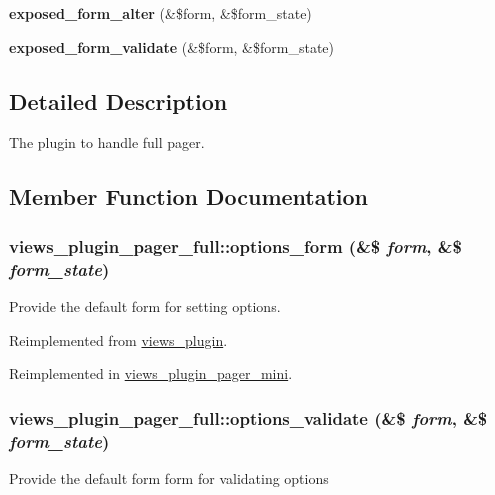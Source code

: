 \begin{DoxyCompactItemize}
\item 
\hypertarget{classviews__plugin__pager__full_a6bf6e6803ad1a864162cf1664592442f}{
{\bfseries exposed\_\-form\_\-alter} (\&\$form, \&\$form\_\-state)}
\label{classviews__plugin__pager__full_a6bf6e6803ad1a864162cf1664592442f}

\item 
\hypertarget{classviews__plugin__pager__full_a8dc9e90defd447d7ca20d63468363f3f}{
{\bfseries exposed\_\-form\_\-validate} (\&\$form, \&\$form\_\-state)}
\label{classviews__plugin__pager__full_a8dc9e90defd447d7ca20d63468363f3f}

\end{DoxyCompactItemize}


\subsection{Detailed Description}
The plugin to handle full pager. 

\subsection{Member Function Documentation}
\hypertarget{classviews__plugin__pager__full_a4f3bcc9bc5ab8ddbbcacdce3108dcfd7}{
\subsubsection[{options\_\-form}]{\setlength{\rightskip}{0pt plus 5cm}views\_\-plugin\_\-pager\_\-full::options\_\-form (\&\$ {\em form}, \/  \&\$ {\em form\_\-state})}}
\label{classviews__plugin__pager__full_a4f3bcc9bc5ab8ddbbcacdce3108dcfd7}
Provide the default form for setting options. 

Reimplemented from \hyperlink{classviews__plugin_a1aaed8da1afd9f45293a37358c159837}{views\_\-plugin}.

Reimplemented in \hyperlink{classviews__plugin__pager__mini_adfab7244c29b6398132916429741bc1f}{views\_\-plugin\_\-pager\_\-mini}.\hypertarget{classviews__plugin__pager__full_a00fca2bdd3dfda2bea07b01a6f8384a4}{
\subsubsection[{options\_\-validate}]{\setlength{\rightskip}{0pt plus 5cm}views\_\-plugin\_\-pager\_\-full::options\_\-validate (\&\$ {\em form}, \/  \&\$ {\em form\_\-state})}}
\label{classviews__plugin__pager__full_a00fca2bdd3dfda2bea07b01a6f8384a4}
Provide the default form form for validating options 

